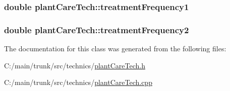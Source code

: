 \hypertarget{classplant_care_tech_a81e833c3367e43f79966c8dec40ba121}{
\subsubsection[{treatmentFrequency1}]{\setlength{\rightskip}{0pt plus 5cm}double {\bf plantCareTech::treatmentFrequency1}}}
\label{classplant_care_tech_a81e833c3367e43f79966c8dec40ba121}
\hypertarget{classplant_care_tech_ab7c0f81e2054bff14fe602ca34bee55b}{
\subsubsection[{treatmentFrequency2}]{\setlength{\rightskip}{0pt plus 5cm}double {\bf plantCareTech::treatmentFrequency2}}}
\label{classplant_care_tech_ab7c0f81e2054bff14fe602ca34bee55b}


The documentation for this class was generated from the following files:\begin{DoxyCompactItemize}
\item 
C:/main/trunk/src/technics/\hyperlink{plant_care_tech_8h}{plantCareTech.h}\item 
C:/main/trunk/src/technics/\hyperlink{plant_care_tech_8cpp}{plantCareTech.cpp}\end{DoxyCompactItemize}
